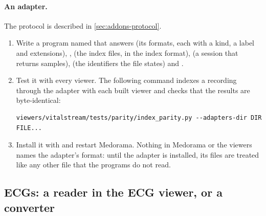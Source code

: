 \paragraph{An adapter.} The protocol is described in \cref{sec:addons-protocol}.
\begin{enumerate}
\item Write a program named  that answers  (its formats, each
  with a kind, a label and extensions), ,  (the index files, in
  the index format),  (a session that returns samples),  (the
  identifiers the file states) and .
\item Test it with every viewer. The following command indexes a recording through the adapter
  with each built viewer and checks that the results are byte-identical:
\begin{lstlisting}[style=shell]
viewers/vitalstream/tests/parity/index_parity.py --adapters-dir DIR FILE...
\end{lstlisting}
\item Install it with  and restart Medorama. Nothing in
  Medorama or the viewers names the adapter's format: until the adapter is installed, its files
  are treated like any other file that the programs do not read.
\end{enumerate}

\subsection{ECGs: a reader in the ECG viewer, or a converter}
\label{sec:readers-ecg}

